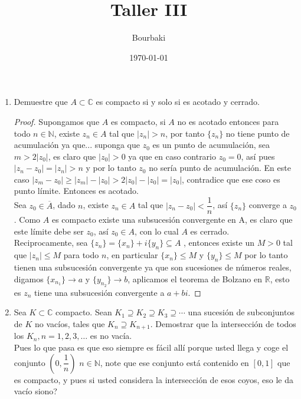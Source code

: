 \documentclass[11pt]{article}
\title{Taller III}
\author{Bourbaki}
\date{\today}
\begin{document}
\maketitle


\begin{enumerate}
    \item Demuestre que \( A \subset \mathbb{C} \) es compacto si y solo si es acotado y cerrado.

    \begin{proof}
    Supongamos que $A$ es compacto, si $A$ no es acotado entonces para todo $n\in \mathbb{N}$, existe $z_n\in A$ tal que $|z_n|>n$, por tanto $\{z_n\}$ no tiene punto de acumulación ya que... suponga que $z_0$ es un punto de acumulación, sea $m>2|z_0|$, es claro que $|z_0|>0$ ya que en caso contrario $z_0=0$, así pues $|z_n-z_0|=|z_n|>n$ y por lo tanto $z_0$ no sería punto de acumulación. En este caso $|z_m-z_0|\geq |z_m|-|z_0|>2|z_0|-|z_0|=|z_0|$, contradice que ese coso es punto límite. Entonces es acotado.\\

    Sea $z_0\in \overline{A}$, dado $n$, existe $z_n\in A$ tal que $|z_n-z_0|<\dfrac{1}{n}$, así $\{z_n\}$ converge a $z_0$. Como $A$ es compacto existe una subsucesión convergente en A, es claro que este límite debe ser $z_0$, así $z_0\in A$, con lo cual $A$ es cerrado.\\

    Reciprocamente, sea $\{z_n\}=\{x_n\}+i\{y_n\}\subseteq A$ , entonces existe un $M>0$ tal que $|z_n|\leq M$ para todo $n$, en particular $\{x_n\}\leq M$ y $\{y_n\}\leq M$ por lo tanto tienen una subsucesión convergente ya que son sucesiones de números reales, digamos $\{x_{n_1}\}\to a$ y $\{y_{n_2}\}\to b$, aplicamos el teorema de Bolzano en $\mathbb{R}$, esto es $z_n$ tiene una subsucesión convergente a $a+bi$.
    \end{proof}

    \item Sea \( K \subset \mathbb{C} \) compacto. Sean \( K_1 \supseteq K_2 \supseteq K_3 \supseteq \cdots \) una sucesión de subconjuntos de \( K \) no vacíos, tales que \( K_n \supseteq K_{n+1} \). Demostrar que la intersección de todos los \( K_n, n = 1, 2, 3, \ldots \) es no vacía.\\

    Pues lo que pasa es que eso siempre es  fácil allí porque usted llega y coge el conjunto $\left(0,\dfrac{1}{n}\right)$ $n\in \mathbb{N}$, note que ese conjunto está contenido en $[0,1]$ que es compacto, y pues si usted considera la intersección de esos coyos, eso le da vacío siono?


\end{enumerate}
\end{document}
